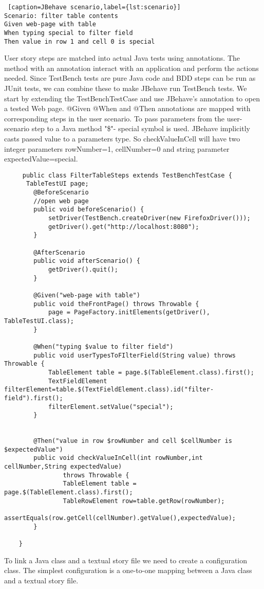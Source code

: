  \lstset{style=jbehave}
  \begin{lstlisting} [caption=JBehave scenario,label={lst:scenario}]
Scenario: filter table contents
Given web-page with table
When typing special to filter field
Then value in row 1 and cell 0 is special
  \end{lstlisting}
User story steps are matched into actual Java tests using annotations. 
 The method with an annotation interact with an application and perform the actions needed.
  Since TestBench tests are pure Java code and BDD steps can be run as JUnit tests, we can combine these to make
   JBehave run TestBench tests. We start by extending the TestBenchTestCase  and use JBehave's \@BeforeScenario
   annotation to open a tested Web page.
   @Given @When and @Then annotations are mapped with corresponding steps in the user scenario.
   To pass parameters from the user-scenario step to a Java method "\$"- special symbol is used.
    JBehave implicitly casts passed value to a parameters type.
    So checkValueInCell will have two integer parameters rowNumber=1, cellNumber=0 and string parameter expectedValue=special. 

  	\lstset{language=Java}
  	\begin{lstlisting}
	 public class FilterTableSteps extends TestBenchTestCase {
	  TableTestUI page;
	    @BeforeScenario
	    //open web page
	    public void beforeScenario() {
	        setDriver(TestBench.createDriver(new FirefoxDriver()));
	        getDriver().get("http://localhost:8080");
	    }
	
	    @AfterScenario
	    public void afterScenario() {
	        getDriver().quit();
	    }
	
	    @Given("web-page with table")
	    public void theFrontPage() throws Throwable {
	        page = PageFactory.initElements(getDriver(), TableTestUI.class);
	    }
	
	    @When("typing $value to filter field")
	    public void userTypesToFIlterField(String value) throws Throwable {
	        TableElement table = page.$(TableElement.class).first();
			TextFieldElement filterElement=table.$(TextFieldElement.class).id("filter-field").first();
			filterElement.setValue("special");
	    }
	
	
	    @Then("value in row $rowNumber and cell $cellNumber is $expectedValue")
	    public void checkValueInCell(int rowNumber,int cellNumber,String expectedValue)
	            throws Throwable {
	            TableElement table = page.$(TableElement.class).first();
				TableRowElement row=table.getRow(rowNumber);
				assertEquals(row.getCell(cellNumber).getValue(),expectedValue);
	    }
	
	}
\end{lstlisting}
To link a Java class and a textual story file we need to create a configuration class.
The simplest configuration is a one-to-one mapping between a Java class and a textual story file. 

